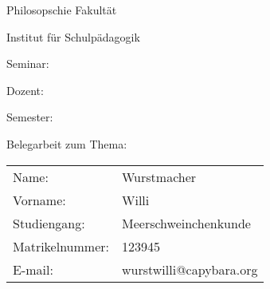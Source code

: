 \documentclass{article}
\begin{document}
\flushleft
\thispagestyle{empty}
\setlength{\parindent}{0pt}
\Large
Philosopschie Fakult\"at\par
Institut f\"ur Schulp\"adagogik\par
Seminar:\par
Dozent:\par
Semester:\par
\vfill
\begin{center}
	Belegarbeit zum Thema:\par
\end{center}
\vfill
\vfill
\begin{tabular}{@{}ll}
Name:& Wurstmacher\\
Vorname:& Willi\\
Studiengang:& Meerschweinchenkunde\\
Matrikelnummer:& 123945\\
E-mail:& wurstwilli@capybara.org\\
\end{tabular}
\end{document}
